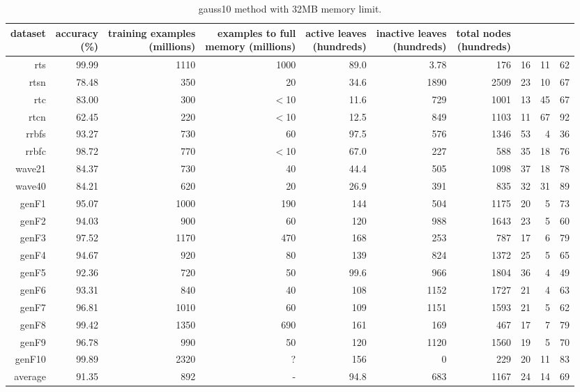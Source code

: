 \clearpage
\begin{table}
\caption{{\sc gauss10} method with 32MB memory limit.}
\label{tab:gauss10-32MB}
\centering
\begin{tabular}{|r|r|r|r|r|r|r|r|r|r|}
\hline
dataset	&
\rotatebox{90}{\parbox{9em}{accuracy\\(\%)}} &
\rotatebox{90}{\parbox{9em}{training examples\\(millions)}} &
\rotatebox{90}{\parbox{9em}{examples to full\\memory (millions)}} &
\rotatebox{90}{\parbox{9em}{active leaves\\(hundreds)}} &
\rotatebox{90}{\parbox{9em}{inactive leaves\\(hundreds)}} &
\rotatebox{90}{\parbox{9em}{total nodes\\(hundreds)}} &
\rotatebox{90}{\parbox{9em}{tree depth}}	&
\rotatebox{90}{\parbox{9em}{training speed (\%)}} &
\rotatebox{90}{\parbox{9em}{prediction speed (\%)}} \\
\hline
{\sc rts} & 99.99 & 1110 & 1000 & 89.0 & 3.78 & 176 & 16 & 11 & 62 \\
{\sc rtsn} & 78.48 & 350 & 20 & 34.6 & 1890 & 2509 & 23 & 10 & 67 \\
{\sc rtc} & 83.00 & 300 & $<$10 & 11.6 & 729 & 1001 & 13 & 45 & 67 \\
{\sc rtcn} & 62.45 & 220 & $<$10 & 12.5 & 849 & 1103 & 11 & 67 & 92 \\
{\sc rrbfs} & 93.27 & 730 & 60 & 97.5 & 576 & 1346 & 53 & 4 & 36 \\
{\sc rrbfc} & 98.72 & 770 & $<$10 & 67.0 & 227 & 588 & 35 & 18 & 76 \\
{\sc wave21} & 84.37 & 730 & 40 & 44.4 & 505 & 1098 & 37 & 18 & 78 \\
{\sc wave40} & 84.21 & 620 & 20 & 26.9 & 391 & 835 & 32 & 31 & 89 \\
{\sc genF1} & 95.07 & 1000 & 190 & 144 & 504 & 1175 & 20 & 5 & 73 \\
{\sc genF2} & 94.03 & 900 & 60 & 120 & 988 & 1643 & 23 & 5 & 60 \\
{\sc genF3} & 97.52 & 1170 & 470 & 168 & 253 & 787 & 17 & 6 & 79 \\
{\sc genF4} & 94.67 & 920 & 80 & 139 & 824 & 1372 & 25 & 5 & 65 \\
{\sc genF5} & 92.36 & 720 & 50 & 99.6 & 966 & 1804 & 36 & 4 & 49 \\
{\sc genF6} & 93.31 & 840 & 40 & 108 & 1152 & 1727 & 21 & 4 & 63 \\
{\sc genF7} & 96.81 & 1010 & 60 & 109 & 1151 & 1593 & 21 & 5 & 62 \\
{\sc genF8} & 99.42 & 1350 & 690 & 161 & 169 & 467 & 17 & 7 & 79 \\
{\sc genF9} & 96.78 & 990 & 50 & 120 & 1120 & 1560 & 19 & 5 & 70 \\
{\sc genF10} & 99.89 & 2320 & ? & 156 & 0 & 229 & 20 & 11 & 83 \\
\hline
average & 91.35 & 892 &  -  & 94.8 & 683 & 1167 & 24 & 14 & 69 \\
\hline
\end{tabular}
\end{table}
